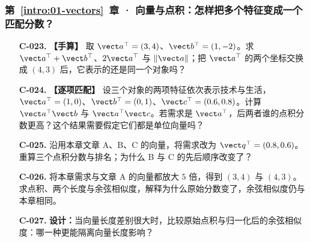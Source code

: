 \subsubsection*{第~\ref*{intro:01-vectors}~章 · 向量与点积：怎样把多个特征变成一个匹配分数？}
\begin{enumerate}[label={},leftmargin=4.8em,itemsep=4pt]
\item[\textbf{C-023.}] \leavevmode{}\label{exercise:C-023}\label{exercise:vector-coordinate-operations}\textbf{【手算】} 取 $\vect a^\top=(3,4)$、$\vect b^\top=(1,-2)$。求 $\vect a^\top+\vect b^\top$、$2\vect a^\top$ 与 $\|\vect a\|$；把 $\vect a^\top$ 的两个坐标交换成 $(4,3)$ 后，它表示的还是同一个对象吗？
\item[\textbf{C-024.}] \leavevmode{}\label{exercise:C-024}\label{exercise:unit-vector-dot-comparison}\textbf{【逐项匹配】} 设三个对象的两项特征依次表示技术与生活，$\vect a^\top=(1,0)$、$\vect b^\top=(0,1)$、$\vect c^\top=(0.6,0.8)$。计算 $\vect a^\top\vect b$ 与 $\vect a^\top\vect c$。若需求是 $\vect a^\top$，后两者谁的点积分数更高？这个结果需要假定它们都是单位向量吗？
\item[\textbf{C-025.}] \leavevmode{}\label{exercise:C-025}\label{exercise:article-query-ranking}沿用本章文章 A、B、C 的向量，将需求改为 $\vect q^\top=(0.8,0.6)$。重算三个点积分数与排名；为什么 B 与 C 的先后顺序改变了？
\item[\textbf{C-026.}] \leavevmode{}\label{exercise:C-026}\label{exercise:cosine-rescaling}将本章需求与文章 A 的向量都放大 $5$ 倍，得到 $(3,4)$ 与 $(4,3)$。求点积、两个长度与余弦相似度，解释为什么原始分数变了，余弦相似度仍与本章相同。
\item[\textbf{C-027.}] \leavevmode{}\label{exercise:C-027}\label{exercise:cosine-length-control}\textbf{设计：}当向量长度差别很大时，比较原始点积与归一化后的余弦相似度：哪一种更能隔离向量长度影响？
\end{enumerate}
